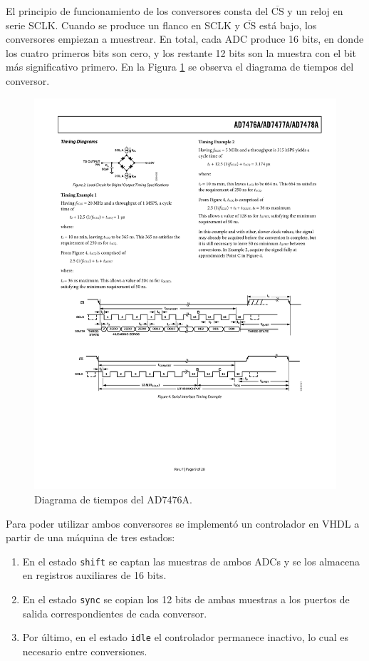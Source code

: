 El principio de funcionamiento de los conversores consta del $\overline{\mbox{CS}}$ y un reloj en serie SCLK. Cuando se produce un flanco en SCLK y $\overline{\mbox{CS}}$ está bajo, los conversores empiezan a muestrear. En total, cada ADC produce 16 bits, en donde los cuatro primeros bits son cero, y los restante 12 bits son la muestra con el bit más significativo primero. En la Figura \ref{adc-timing} se observa el diagrama de tiempos del conversor.

\begin{figure}[hbt!]
    \centering
    \includegraphics[width=0.85\columnwidth]{Imágenes/Conversor analógico-digital/Diagrama de tiempos del AD7476A.pdf}
    \caption{Diagrama de tiempos del AD7476A.}
    \label{adc-timing}
\end{figure} 

Para poder utilizar ambos conversores se implementó un controlador en VHDL a partir de una máquina de tres estados:

\begin{enumerate}
    \item En el estado \texttt{shift} se captan las muestras de ambos ADCs y se los almacena en registros auxiliares de 16 bits.
    \item En el estado \texttt{sync} se copian los 12 bits de ambas muestras a los puertos de salida correspondientes de cada conversor.
    \item Por último, en el estado \texttt{idle} el controlador permanece inactivo, lo cual es necesario entre conversiones.
\end{enumerate}

